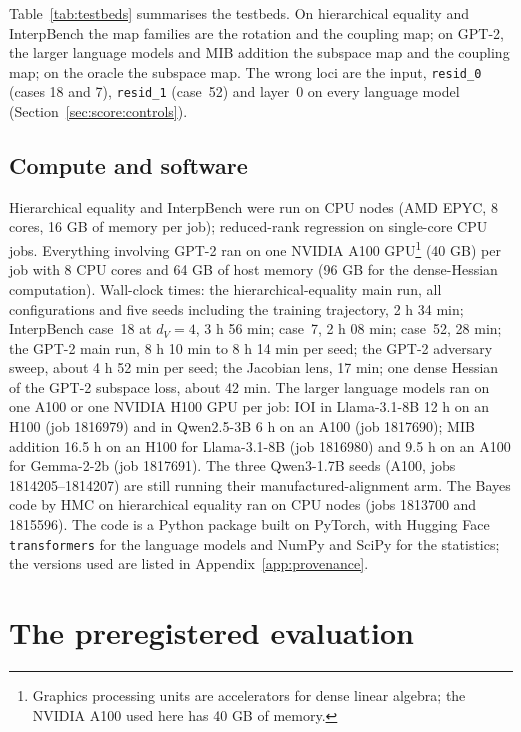 \documentclass[11pt,a4paper]{article}
\newcommand{\dv}{d_V}
\begin{document}
Table~\ref{tab:testbeds} summarises the testbeds. On hierarchical equality and InterpBench the map families are the rotation and the coupling map; on GPT-2, the larger language models and MIB addition the subspace map and the coupling map; on the oracle the subspace map. The wrong loci are the input, \texttt{resid\_0} (cases 18 and 7), \texttt{resid\_1} (case~52) and layer~0 on every language model (Section~\ref{sec:score:controls}).

\subsection{Compute and software}
\label{sec:tb:compute}

Hierarchical equality and InterpBench were run on CPU nodes (AMD EPYC, 8 cores, 16 GB of memory per job); reduced-rank regression on single-core CPU jobs. Everything involving GPT-2 ran on one NVIDIA A100 GPU\footnote{Graphics processing units are accelerators for dense linear algebra; the NVIDIA A100 used here has 40 GB of memory.} (40 GB) per job with 8 CPU cores and 64 GB of host memory (96 GB for the dense-Hessian computation). Wall-clock times: the hierarchical-equality main run, all configurations and five seeds including the training trajectory, 2 h 34 min; InterpBench case~18 at $\dv=4$, 3 h 56 min; case~7, 2 h 08 min; case~52, 28 min; the GPT-2 main run, 8 h 10 min to 8 h 14 min per seed; the GPT-2 adversary sweep, about 4 h 52 min per seed; the Jacobian lens, 17 min; one dense Hessian of the GPT-2 subspace loss, about 42 min. The larger language models ran on one A100 or one NVIDIA H100 GPU per job: IOI in Llama-3.1-8B 12 h on an H100 (job 1816979) and in Qwen2.5-3B 6 h on an A100 (job 1817690); MIB addition 16.5 h on an H100 for Llama-3.1-8B (job 1816980) and 9.5 h on an A100 for Gemma-2-2b (job 1817691). The three Qwen3-1.7B seeds (A100, jobs 1814205--1814207) are still running their manufactured-alignment arm. The Bayes code by HMC on hierarchical equality ran on CPU nodes (jobs 1813700 and 1815596). The code is a Python package built on PyTorch, with Hugging Face \texttt{transformers} for the language models and NumPy and SciPy for the statistics; the versions used are listed in Appendix~\ref{app:provenance}.

\section{The preregistered evaluation}
\label{sec:prereg}
\end{document}
